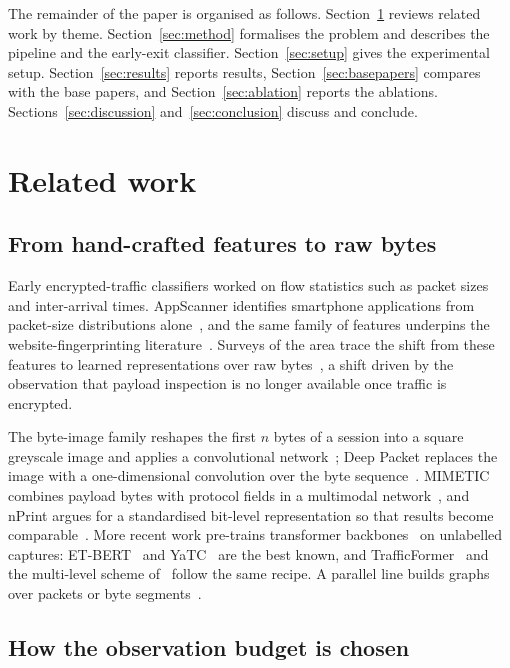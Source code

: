 \documentclass[pdflatex,sn-mathphys-num]{sn-jnl}
\theoremstyle{thmstyleone}%
\theoremstyle{thmstylethree}%
\begin{document}
The remainder of the paper is organised as follows.
Section~\ref{sec:related} reviews related work by theme.
Section~\ref{sec:method} formalises the problem and describes the pipeline and
the early-exit classifier. Section~\ref{sec:setup} gives the experimental
setup. Section~\ref{sec:results} reports results,
Section~\ref{sec:basepapers} compares with the base papers, and
Section~\ref{sec:ablation} reports the ablations.
Sections~\ref{sec:discussion} and~\ref{sec:conclusion} discuss and conclude.

\section{Related work}\label{sec:related}

\subsection{From hand-crafted features to raw bytes}

Early encrypted-traffic classifiers worked on flow statistics such as packet
sizes and inter-arrival times. AppScanner identifies smartphone applications
from packet-size distributions alone~\cite{appscanner}, and the same family of
features underpins the website-fingerprinting literature~\cite{rimmer,
deepfinger}. Surveys of the area trace the shift from these features to
learned representations over raw bytes~\cite{rezaei, survey}, a shift driven by
the observation that payload inspection is no longer available once traffic is
encrypted.

The byte-image family reshapes the first $n$ bytes of a session into a square
greyscale image and applies a convolutional network~\cite{ustc}; Deep Packet
replaces the image with a one-dimensional convolution over the byte
sequence~\cite{deeppacket, wang1d}. MIMETIC combines payload bytes with
protocol fields in a multimodal network~\cite{mimetic}, and nPrint argues for a
standardised bit-level representation so that results become
comparable~\cite{nprint}. More recent work pre-trains transformer
backbones~\cite{transformer, bert} on unlabelled captures: ET-BERT~\cite{etbert}
and YaTC~\cite{yatc} are the best known, and TrafficFormer~\cite{p6} and the
multi-level scheme of~\cite{p7} follow the same recipe. A parallel line builds
graphs over packets or byte segments~\cite{p1, p4, p9}.

\subsection{How the observation budget is chosen}
\end{document}
